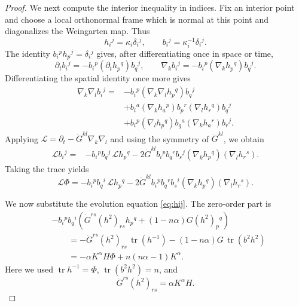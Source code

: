 \documentclass[11pt, reqno]{amsart}
\theoremstyle{remark}
\theoremstyle{definition}
\numberwithin{equation}{section}
\DeclareMathOperator{\tr}{tr}
\newcommand{\cL}{\mathcal L}
\begin{document}
\begin{proof}
We next compute the interior inequality in indices.  Fix an interior point and choose a local orthonormal frame which is normal at this point and diagonalizes the Weingarten map.  Thus
\begin{equation*}
        h_i{}^j=\kappa_i\delta_i{}^j,
        \qquad
        b_i{}^j=\kappa_i^{-1}\delta_i{}^j.
\end{equation*}
The identity $b_i{}^p h_p{}^j=\delta_i{}^j$ gives, after differentiating once in space or time,
\begin{equation*}
        \partial_t b_i{}^j=-b_i{}^p(\partial_t h_p{}^q)b_q{}^j,
        \qquad
        \nabla_k b_i{}^j=-b_i{}^p(\nabla_k h_p{}^q)b_q{}^j.
\end{equation*}
Differentiating the spatial identity once more gives
\begin{align*}
        \nabla_k\nabla_l b_i{}^j
        ={}&-b_i{}^p(\nabla_k\nabla_l h_p{}^q)b_q{}^j  \\
        &+b_i{}^a(\nabla_kh_a{}^p)b_p{}^r(\nabla_lh_r{}^q)b_q{}^j  \\
        &+b_i{}^p(\nabla_lh_p{}^q)b_q{}^a(\nabla_kh_a{}^r)b_r{}^j .
\end{align*}
Applying $\cL=\partial_t-\dot G^{kl}\nabla_k\nabla_l$ and using the symmetry of $\dot G^{kl}$, we obtain
\begin{align*}
        \cL b_i{}^j
        ={}&-b_i{}^p b_q{}^j\,\cL h_p{}^q  -2\dot G^{kl}b_i{}^p b_q{}^r b_s{}^j
        (\nabla_k h_p{}^q)(\nabla_l h_r{}^s).
\end{align*}
Taking the trace yields
\begin{equation}\label{eq:L-b-trace-alpha}
        \cL\Phi
        =-b_i{}^p b_q{}^i\,\cL h_p{}^q
        -2\dot G^{kl}b_i{}^p b_q{}^r b_s{}^i
        (\nabla_k h_p{}^q)(\nabla_l h_r{}^s).
\end{equation}

We now substitute the evolution equation \eqref{eq:hij}.  The zero-order part is
\begin{equation}\label{eq:Phi-zero-alpha}
\begin{aligned}
 &-b_i{}^p b_q{}^i
 \left(\dot G^{rs}(h^2)_{rs}h_p{}^q+(1-n\alpha)G(h^2)_p{}^q\right)  \\
 &\qquad
 =-\dot G^{rs}(h^2)_{rs}\,\tr(h^{-1})
   -(1-n\alpha)G\,\tr(b^2h^2)  \\
 &\qquad
 =-\alpha K^\alpha H\Phi+n(n\alpha-1)K^\alpha.
\end{aligned}
\end{equation}
Here we used $\tr h^{-1}=\Phi$, $\tr (b^2h^2)=n$, and
\begin{equation*}
        \dot G^{rs}(h^2)_{rs}=\alpha K^\alpha H.
\end{equation*}


\end{proof}
\end{document}

